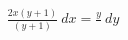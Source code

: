 \documentclass[preview]{standalone}
\begin{document}
\begin{align*}
\frac{2 x \left( y + 1 \right)}{\left( y + 1 \right)} \  dx = \frac{y}{\ } \  dy
\end{align*}
\end{document}
